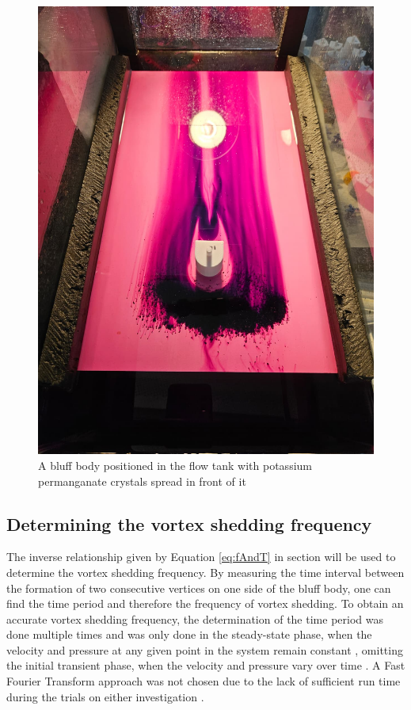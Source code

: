 \begin{figure}[H]
	\centering
	\includegraphics[width=\textwidth]{images/shapeInTank.jpg}
	\caption{A bluff body positioned in the flow tank with potassium permanganate crystals spread in front of it}
	\label{fig:shapeInTank}
\end{figure}

\subsection{Determining the vortex shedding frequency}
The inverse relationship given by Equation \eqref{eq:fAndT} in section  will be used to determine the vortex shedding frequency. By measuring the time interval between the formation of two consecutive vertices on one side of the bluff body, one can find the time period and therefore the frequency of vortex shedding. To obtain an accurate vortex shedding frequency, the determination of the time period was done multiple times and was only done in the steady-state phase, when the velocity and pressure at any given point in the system remain constant \parencite{noauthor_steady_nodate}, omitting the initial transient phase, when the velocity and pressure vary over time \parencite{noauthor_transient_nodate}. A Fast Fourier Transform approach was not chosen due to the lack of sufficient run time during the trials on either investigation \parencites[10--11]{shi2025vortex}[12]{xu_experimental_2025}.